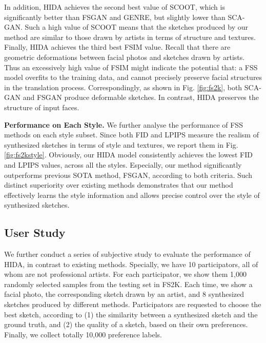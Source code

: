 \documentclass[10pt,twocolumn,letterpaper]{article}
\begin{document}
In addition, HIDA achieves the second best value of SCOOT, which is significantly better than FSGAN and GENRE, but slightly lower than SCA-GAN. 
Such a high value of SCOOT means that the sketches produced by our method are similar to those drawn by artists in terms of structure and textures. 
%
Finally, HIDA achieves the third best FSIM value. Recall that there are geometric deformations between facial photos and sketches drawn by artists. Thus an excessively high value of FSIM might indicate the potential that: a FSS model overfits to the training data, and cannot precisely preserve facial structures in the translation process. Correspondingly, as shown in Fig. \ref{fig:fs2k}, both SCA-GAN and FSGAN produce deformable sketches. In contrast, HIDA preserves the structure of input faces. 


\textbf{Performance on Each Style.}
We further analyse the performance of FSS methods on each style subset. Since both FID and LPIPS measure the realism of synthesized sketches in terms of style and textures, we report them in Fig. \ref{fig:fs2kstyle}. Obviously, our HIDA model consistently achieves the lowest FID and LPIPS values, across all the styles. Especially, our method significantly outperforms previous SOTA method, FSGAN, according to both criteria. Such distinct superiority over existing methods demonstrates that our method effectively learns the style information and allows precise control over the style of synthesized sketches. 

\subsection{User Study}
\label{ssec:exp_subj}

We further conduct a series of subjective study to evaluate the performance of HIDA, in contrast to existing methods. Specially, we have 10 participators, all of whom are not professional artists. For each participator, we show them 1,000 randomly selected samples from the testing set in FS2K. Each time, we show a facial photo, the corresponding sketch drawn by an artist, and 8 synthesized sketches produced by different methods. Participators are requested to choose the best sketch, according to (1) the similarity between a synthesized sketch and the ground truth, and (2) the quality of a sketch, based on their own preferences. Finally, we collect totally 10,000 preference labels. 
\end{document}
